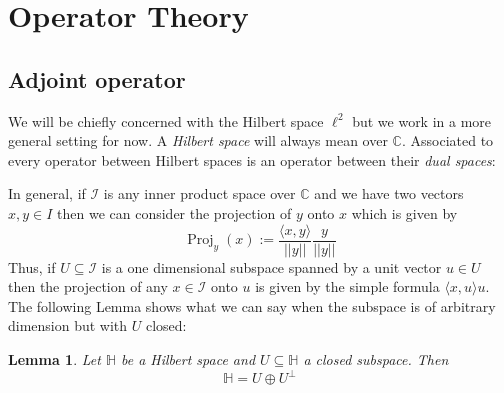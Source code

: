 \documentclass[12pt]{article}
\theoremstyle{plain}
\newtheorem{lemma}[thm]{Lemma}
\theoremstyle{definition}
\newcommand{\bb}[1]{\mathbb{#1}}
\newcommand{\call}[1]{\mathcal{#1}}
\begin{document}
\section{Operator Theory}
\subsection{Adjoint operator}
We will be chiefly concerned with the Hilbert space $\ell^2$ but we work in a more general setting for now. A \emph{Hilbert space} will always mean over $\bb{C}$. Associated to every operator between Hilbert spaces is an operator between their \emph{dual spaces}:

In general, if $\call{I}$ is any inner product space over $\bb{C}$ and we have two vectors $x,y \in I$ then we can consider the projection of $y$ onto $x$ which is given by
\begin{equation}\label{eq:easy_case}
    \operatorname{Proj}_y(x) := \frac{\langle x, y \rangle}{||y||} \frac{y}{||y||}
\end{equation}
Thus, if $U \subseteq \call{I}$ is a one dimensional subspace spanned by a unit vector $u \in U$ then the projection of any $x \in \call{I}$ onto $u$ is given by the simple formula $\langle x,u\rangle u$. The following Lemma shows what we can say when the subspace is of arbitrary dimension but with $U$ closed:
\begin{lemma}\label{lem:decomposition}
Let $\bb{H}$ be a Hilbert space and $U \subseteq \bb{H}$ a closed subspace. Then
\[\bb{H} = U \oplus U^\perp\]
\end{lemma}
\end{document}
